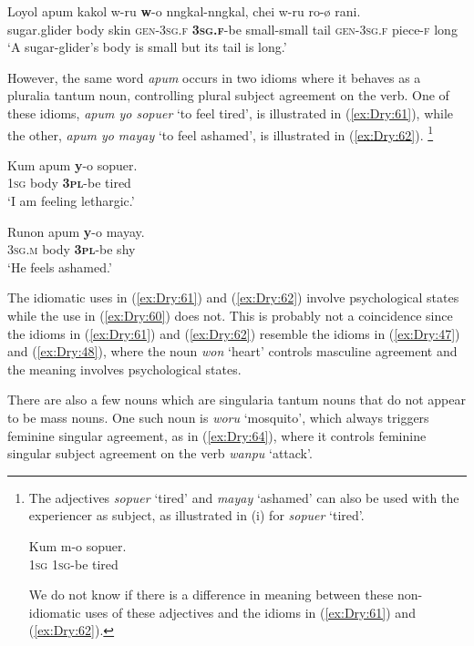 \documentclass[output=collectionpaper]{langsci/langscibook}
\begin{document}
\ea \label{ex:Dry:60}
\gll Loyol	apum	kakol	w-ru	\textbf{w}-o nngkal-nngkal,	chei	w-ru	ro-ø	rani.\\
sugar.glider body skin \textsc{gen}-\textsc{3sg.f} \textbf{\textsc{3sg.f}}-be small-small tail \textsc{gen}-\textsc{3sg.f} piece-\textsc{f} long\\
\glt `A sugar-glider's body is small but its tail is long.'
\z

However, the same word \textit{apum} occurs in two idioms where it behaves as a pluralia tantum noun, controlling plural subject agreement on the verb. One of these idioms, \textit{apum yo sopuer} `to feel tired', is illustrated in (\ref{ex:Dry:61}), while the other, \textit{apum yo mayay} `to feel ashamed', is illustrated in (\ref{ex:Dry:62}).%
\footnote{The adjectives \textit{sopuer} `tired' and \textit{mayay} `ashamed' can also be used with the experiencer as subject, as illustrated in (i) for \textit{sopuer} `tired'.

\begin{exe}
  \let\eachwordtwo=\footnotesize
{}
{
\gll Kum	m-o	sopuer.\\
\textsc{1sg} \textsc{1sg}-be tired\\
}
\end{exe}

\noindent We do not know if there is a difference in meaning between these non-idiomatic uses of these adjectives and the idioms in (\ref{ex:Dry:61}) and (\ref{ex:Dry:62}).}

\ea \label{ex:Dry:61}
\gll Kum	apum	\textbf{y}-o	sopuer.\\
\textsc{1sg} body \textbf{\textsc{3pl}}-be tired\\
\glt  `I am feeling lethargic.'
\z

\ea \label{ex:Dry:62}
\gll Runon	apum	\textbf{y}-o	mayay.\\
\textsc{3sg.m} body \textbf{\textsc{3pl}}-be shy\\
\glt  `He feels ashamed.'
\z

The idiomatic uses in (\ref{ex:Dry:61}) and (\ref{ex:Dry:62}) involve psychological states while the use in (\ref{ex:Dry:60}) does not. This is probably not a coincidence since the idioms in (\ref{ex:Dry:61}) and (\ref{ex:Dry:62}) resemble the idioms in (\ref{ex:Dry:47}) and (\ref{ex:Dry:48}), where the noun \textit{won} `heart' controls masculine agreement and the meaning involves psychological states.

There are also a few nouns which are singularia tantum nouns that do not appear to be mass nouns. One such noun is \textit{woru} `mosquito', which always triggers feminine singular agreement, as in (\ref{ex:Dry:64}), where it controls feminine singular subject agreement on the verb \textit{wanpu} `attack'.
\end{document}
